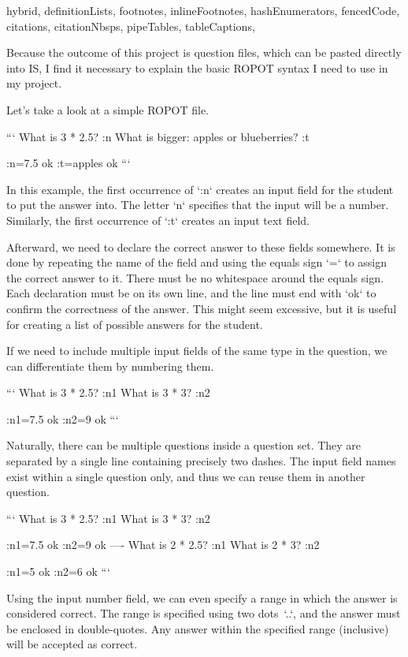 \shorthandoff{-}
\begin{markdown*}{%
  hybrid,
  definitionLists,
  footnotes,
  inlineFootnotes,
  hashEnumerators,
  fencedCode,
  citations,
  citationNbsps,
  pipeTables,
  tableCaptions,
}

Because the outcome of this project is question files, which can be pasted directly into IS, I find it necessary to explain the basic ROPOT syntax I need to use in my project. 

Let's take a look at a simple ROPOT file.

```
What is 3 * 2.5? :n
What is bigger: apples or blueberries? :t

:n=7.5 ok
:t=apples ok
```

In this example, the first occurrence of `:n` creates an input field for the student to put the answer into. The letter `n` specifies that the input will be a number. Similarly, the first occurrence of `:t` creates an input text field.

Afterward, we need to declare the correct answer to these fields somewhere. It is done by repeating the name of the field and using the equals sign `=` to assign the correct answer to it. There must be no whitespace around the equals sign. Each declaration must be on its own line, and the line must end with `ok` to confirm the correctness of the answer. This might seem excessive, but it is useful for creating a list of possible answers for the student.

If we need to include multiple input fields of the same type in the question, we can differentiate them by numbering them.

```
What is 3 * 2.5? :n1
What is 3 * 3?   :n2 

:n1=7.5 ok
:n2=9   ok
```

Naturally, there can be multiple questions inside a question set. They are separated by a single line containing precisely two dashes. The input field names exist within a single question only, and thus we can reuse them in another question.

```
What is 3 * 2.5? :n1
What is 3 * 3?   :n2 

:n1=7.5 ok
:n2=9   ok
----
What is 2 * 2.5? :n1
What is 2 * 3?   :n2 

:n1=5 ok
:n2=6 ok
```

Using the input number field, we can even specify a range in which the answer is considered correct. The range is specified using two dots~`..`, and the answer must be enclosed in double-quotes. Any answer within the specified range (inclusive) will be accepted as correct.


\end{markdown*}
